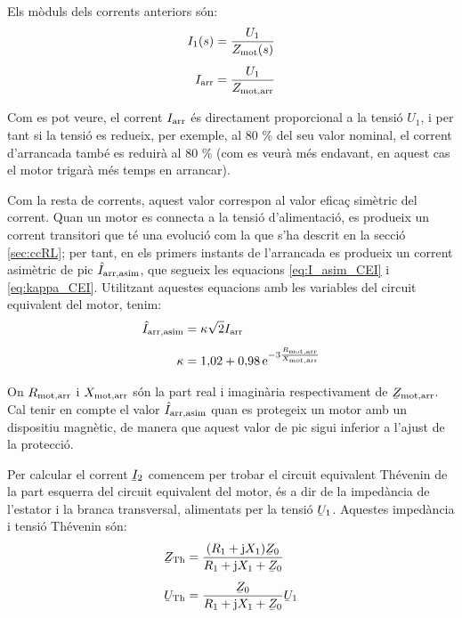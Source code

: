 Els mòduls dels corrents anteriors són:
\begin{subequations}
\begin{align}
    I_1(s) &= \frac{U_1}{Z_\mathrm{mot}(s)} \label{eq:mot-I1}\\[1ex]
    I_\mathrm{arr} &= \frac{U_1}{Z_\mathrm{mot,arr}}
\end{align}
\end{subequations}

Com es pot veure, el corrent $I_\mathrm{arr}$ és directament proporcional a la tensió $U_1$, i per tant si la tensió es redueix, per exemple, al 80 \% del seu valor nominal, el corrent d'arrancada també es reduirà al 80 \% (com es veurà més endavant, en aquest cas el motor trigarà més temps en arrancar).

Com la resta de corrents, aquest valor correspon al valor eficaç simètric del corrent. Quan un motor es connecta a la tensió d'alimentació, es produeix un corrent transitori que té una evolució com la que s'ha descrit en la secció \vref{sec:ccRL}; per tant, en els primers instants de l'arrancada es produeix un corrent asimètric de pic $\hat{I}_\mathrm{arr,asim}$, que segueix les equacions \eqref{eq:I_asim_CEI} i \eqref{eq:kappa_CEI}. Utilitzant aquestes equacions amb les variables del circuit equivalent del motor, tenim:
\begin{subequations}
\begin{align}
    \hat{I}_\mathrm{arr,asim} &= \kappa \sqrt{2} I_\mathrm{arr}  \\[1ex]
    \kappa &= 1{,}02 + 0{,}98 \,\mathrm{e}^{-3\frac{R_\mathrm{mot,arr}}{X_\mathrm{mot,arr}}}
\end{align}
\end{subequations}

On $R_\mathrm{mot,arr}$ i $X_\mathrm{mot,arr}$ són la part real i imaginària respectivament de $\cmplx{Z}\ped{mot,arr}$. Cal tenir en compte el valor $\hat{I}_\mathrm{arr,asim}$ quan es protegeix un motor amb un dispositiu magnètic, de manera que aquest valor de pic sigui inferior a l'ajust de la protecció.

Per calcular el corrent $\cmplx{I}_2$ comencem per trobar el circuit equivalent Thévenin de la part esquerra del circuit equivalent del motor, és a dir de la impedància de l'estator i la branca transversal, alimentats per la tensió $\cmplx{U}_1$. Aquestes impedància i tensió Thévenin són:
\begin{subequations}
\begin{align}
    \cmplx{Z}\ped{Th} &= \frac{(R_1 + \ju X_1) \cmplx{Z}_0}{R_1 + \ju X_1 + \cmplx{Z}_0} \label{eq:mot-ZTh} \\[1ex]
    \cmplx{U}\ped{Th} &= \frac{\cmplx{Z}_0}{R_1 + \ju X_1 + \cmplx{Z}_0} \cmplx{U}_1 \label{eq:mot-UTh}
\end{align}
\end{subequations}

